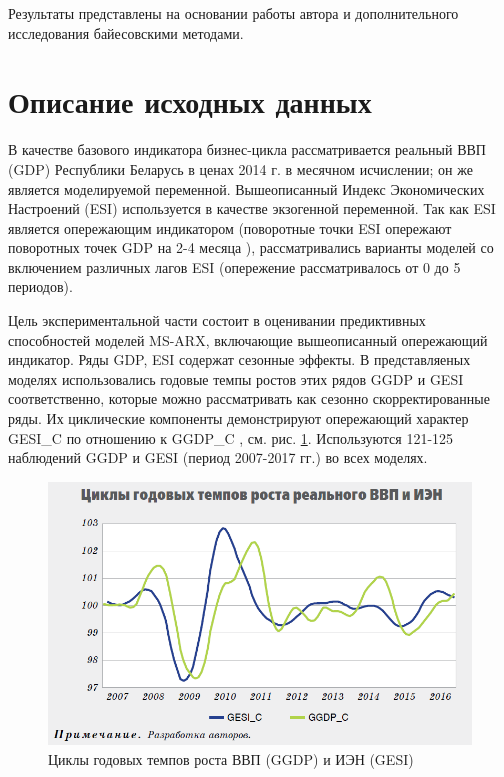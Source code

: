 \documentclass[a4paper,14pt]{extreport}
\begin{document}
Результаты представлены на основании работы автора \cite{mak_mal_bv_2020} и дополнительного исследования байесовскими методами.


\section{Описание исходных данных}

\label{section:gdp_data}

В качестве базового индикатора бизнес-цикла рассматривается реальный ВВП (GDP) Республики Беларусь в ценах 2014 г. в месячном исчислении; он же является моделируемой переменной. Вышеописанный Индекс Экономических Настроений (ESI) используется в качестве экзогенной переменной. Так как ESI является опережающим индикатором (поворотные точки ESI опережают поворотных точек GDP на 2-4 месяца \cite{esiMaking,esiExtra}), рассматривались варианты моделей со включением различных лагов ESI (опережение рассматривалось от 0 до 5 периодов). 

Цель экспериментальной части \cite{mak_mal_bv_2020} состоит в оценивании предиктивных способностей моделей MS-ARX, включающие вышеописанный опережающий индикатор. Ряды GDP, ESI содержат сезонные эффекты. В представляеных моделях использовались годовые темпы ростов этих рядов GGDP и GESI соответственно, которые можно рассматривать как сезонно скорректированные ряды. Их циклические компоненты демонстрируют опережающий характер GESI\_C по отношению к GGDP\_C \cite{mak_mal_bv_2020}, см. рис. \ref{fig:bv_ggdp_cycles}. Используются 121-125 наблюдений GGDP и GESI (период 2007-2017 гг.) во всех моделях.

\begin{figure}[H]
	\includegraphics[width=\linewidth]{img/manual/bv_ggdp_cycles.png}
	\caption{Циклы годовых темпов роста ВВП (GGDP) и ИЭН (GESI)}
	\label{fig:bv_ggdp_cycles}
\end{figure}
\end{document}

